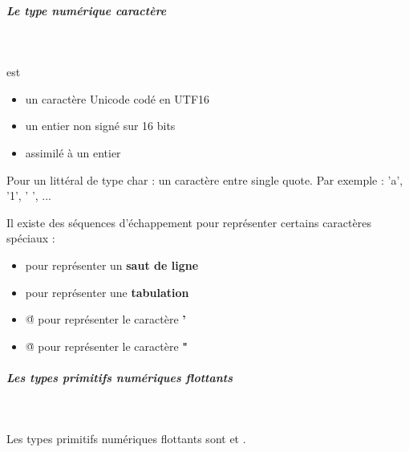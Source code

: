 \documentclass[11pt,a4paper]{article}
\begin{document}
			
		\subparagraph{Le type num\'erique caract\`ere} 
		
					\textcolor{white}{.} \par
				
            \par
        \verb@char@ est
          
					\begin{itemize}
				
			\item un caract\`ere Unicode cod\'e en UTF16
			\item un entier non sign\'e sur 16 bits
			\item assimil\'e \`a un entier 
					\end{itemize}
				
            \par
        
          Pour un litt\'eral de type char : un caract\`ere entre single quote.
          Par exemple : 'a', '1', ' ', ...
        
            \par
        
          Il existe des s\'equences d'\'echappement pour repr\'esenter certains caract\`eres sp\'eciaux :
          
					\begin{itemize}
				
			\item \verb@\n@ pour repr\'esenter un \textbf{saut de ligne}
			\item \verb@\t@ pour repr\'esenter une \textbf{tabulation}
			\item \verb@\'@ pour repr\'esenter le caract\`ere \textbf{'}
			\item \verb@\"@ pour repr\'esenter le caract\`ere \textbf{"}
					\end{itemize}
				
            \par
        
			
		\subparagraph{Les types primitifs num\'eriques flottants} 
		
					\textcolor{white}{.} \par
				
            \par
        
          Les types primitifs num\'eriques flottants sont
          \verb@float@ et \verb@double@.
          
\end{document}
